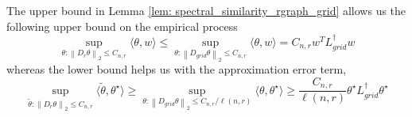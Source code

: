 \documentclass{article}
\newcommand{\norm}[1]{\left\lVert#1\right\rVert}
\newcommand{\dotp}[2]{\langle #1, #2 \rangle}
\newcommand{\1}{\mathbb{I}}
\newcommand{\Linv}{L^{\dagger}}
\theoremstyle{alden}
\theoremstyle{aldenthm}
\theoremstyle{definition}
\theoremstyle{remark}
\begin{document}
The upper bound in Lemma \ref{lem: spectral_similarity_rgraph_grid} allows us the following upper bound on the empirical process
\begin{equation*}
\sup_{\theta: \norm{D_{r}\theta}_2 \leq C_{n,r}} \dotp{\theta}{w} \leq  \sup_{\theta: \norm{D_{grid}\theta}_2 \leq C_{n,r}} \dotp{\theta}{w} = C_{n,r} w^T{\Linv_{grid}}w 
\end{equation*}
whereas the lower bound helps us with the approximation error term,
\begin{equation*}
\sup_{\widetilde{\theta}: \norm{D_{r}\theta}_2 \leq C_{n,r}} \dotp{\widetilde{\theta}}{\theta^{\star}} \geq \sup_{\theta: \norm{D_{grid}\theta}_2 \leq C_{n,r}/ \ell(n,r)} \dotp{\theta}{\theta^{\star}} \geq \frac{C_{n,r}}{\ell(n,r)} \theta^{\star}\Linv_{grid} \theta^{\star}
\end{equation*}
\end{document}
